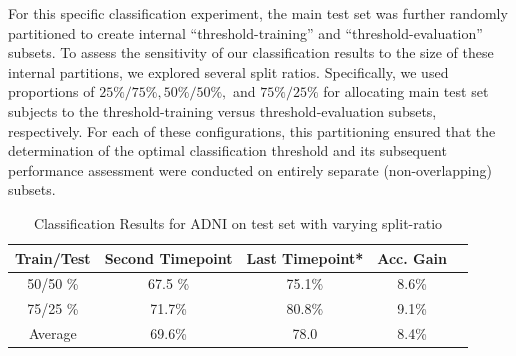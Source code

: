 \documentclass[twoside]{article}
\begin{document}
For this specific classification experiment, the main test set was further randomly partitioned to create internal ``threshold-training'' and ``threshold-evaluation'' subsets. To assess the sensitivity of our classification results to the size of these internal partitions, we explored several split ratios. Specifically, we used proportions of $25\%/75\%, 50\%/50\%,$ and $75\%/25\% $ for allocating main test set subjects to the threshold-training versus threshold-evaluation subsets, respectively. For each of these configurations, this partitioning ensured that the determination of the optimal classification threshold and its subsequent performance assessment were conducted on entirely separate (non-overlapping)  subsets.

\begin{table}[ht]
\label{app:tab_adni_classification}
\centering
\caption{Classification Results for ADNI on test set with varying split-ratio}
\begin{tabular}{ccccc}
\hline
\textbf{Train/Test} & \textbf{Second Timepoint} & \textbf{Last Timepoint*}&\textbf{Acc. Gain}& \\ \hline 
50/50  \%  &  67.5 \%   & 75.1\%      & 8.6\%               \\ \hline
75/25 \%    & 71.7\%     & 80.8\%            & 9.1\%          \\
\bottomrule
Average          & 69.6\%            &  78.0 &    8.4\%     \\ \hline
\end{tabular}

\end{table}


      
\end{document}
